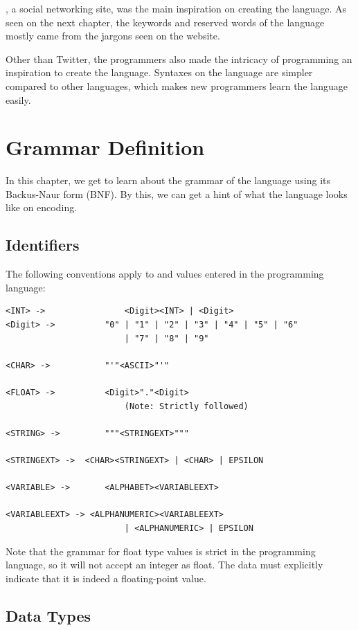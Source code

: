 \documentclass[11pt,a4paper]{report}
\begin{document}
, a social networking site, was the main inspiration on creating
the language. As seen on the next chapter, the keywords and reserved words of the
language mostly came from the jargons seen on the website. \par

Other than Twitter, the programmers also made the intricacy of programming an
inspiration to create the language. Syntaxes on the language are simpler
compared to other languages, which makes new programmers learn the language
easily.

\chapter{Grammar Definition}

In this chapter, we get to learn about the grammar of the language using its
Backus-Naur form (BNF). By this, we can get a hint of what the language looks
like on encoding.

\section{Identifiers}

The following conventions apply to  and values entered in the
programming language:

\begin{lstlisting}
<INT> ->				<Digit><INT> | <Digit>
<Digit> ->			"0" | "1" | "2" | "3" | "4" | "5" | "6"
						| "7" | "8" | "9"

<CHAR> ->			"'"<ASCII>"'"

<FLOAT> ->			<Digit>"."<Digit>
						(Note: Strictly followed)

<STRING> -> 		"""<STRINGEXT>"""

<STRINGEXT> -> 	<CHAR><STRINGEXT> | <CHAR> | EPSILON

<VARIABLE> -> 		<ALPHABET><VARIABLEEXT>

<VARIABLEEXT> -> <ALPHANUMERIC><VARIABLEEXT>
						| <ALPHANUMERIC> | EPSILON
\end{lstlisting}

Note that the grammar for float type values is strict in the programming
language, so it will not accept an integer as float. The data must explicitly
indicate that it is indeed a floating-point value.

\section{Data Types}
\end{document}

